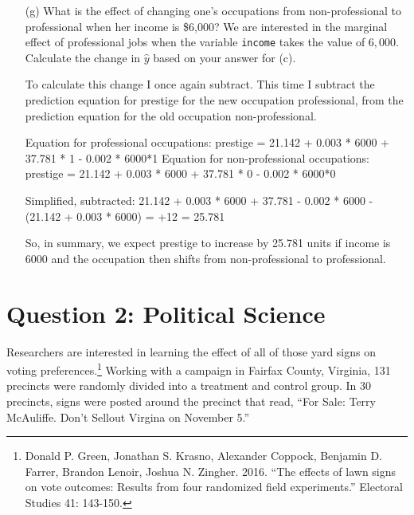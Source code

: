 \documentclass[12pt,letterpaper]{article}
\begin{document}
\begin{enumerate}
	Subtracting the simplified formulas:
	21.142 + 37.781 + 0.003 * income - 0.002 * income - (21.142 + 37.781 - 2 + 3 + 0.003 * income - 0.002 * income) = \newline
	
	-2+3=1
	
	So, in summary when income increases by \$1000 prestige is expected to increase by 1 unit (after rounding to three decimal points) for somebody considered a  professional. 
	
	\item [(g)]
	What is the effect of changing one's occupations from non-professional to professional when her income is \$6,000? We are interested in the marginal effect of professional jobs when the variable \texttt{income} takes the value of $6,000$. Calculate the change in $\hat{y}$ based on your answer for (c).
	
	To calculate this change I once again subtract. This time I subtract the prediction equation for prestige for the new occupation professional, from the prediction equation for the old occupation non-professional.
	
	Equation for professional occupations: \newline prestige = 21.142 + 0.003 * 6000 + 37.781 * 1 - 0.002 * 6000*1 \newline
	Equation for non-professional occupations: \newline prestige = 21.142 + 0.003 * 6000 + 37.781 * 0 - 0.002 * 6000*0
	
	Simplified, subtracted:
	21.142 + 0.003 * 6000 + 37.781 - 0.002 * 6000 - (21.142 + 0.003 * 6000) = +12 = 25.781
	
	So, in summary, we expect prestige to increase by 25.781 units if income is $6000$ and the occupation then shifts from non-professional to professional. 
	
\end{enumerate}

\newpage

\section*{Question 2: Political Science}
\vspace{.25cm}
\noindent 	Researchers are interested in learning the effect of all of those yard signs on voting preferences.\footnote{Donald P. Green, Jonathan	S. Krasno, Alexander Coppock, Benjamin D. Farrer,	Brandon Lenoir, Joshua N. Zingher. 2016. ``The effects of lawn signs on vote outcomes: Results from four randomized field experiments.'' Electoral Studies 41: 143-150. } Working with a campaign in Fairfax County, Virginia, 131 precincts were randomly divided into a treatment and control group. In 30 precincts, signs were posted around the precinct that read, ``For Sale: Terry McAuliffe. Don't Sellout Virgina on November 5.'' \\
\end{document}
